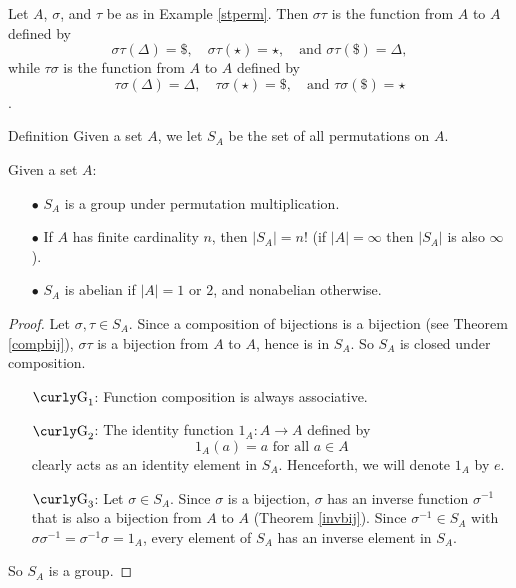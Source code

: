 \begin{example}{} Let $A$, $\sigma$, and $\tau$ be as in Example \ref{stperm}.
Then $\sigma \tau$ is the function from $A$ to $A$ defined by $$\sigma \tau(\Delta)=\$, \quad \sigma \tau(\star)=\star, \quad \mbox{and } \sigma \tau(\$)=\Delta,$$ while $\tau \sigma$ is
the function from $A$ to $A$ defined by $$\tau \sigma (\Delta)=\Delta, \quad \tau \sigma (\star)=\$, \quad \mbox{and } \tau \sigma(\$)=\star $$.
\end{example}

\begin{df}{Definition} Given a set $A$, we let $S_A$ be the set of all
permutations on $A$.\end{df}


\begin{thm}\label{sym}
Given a set $A$:
\begin{enumerate}
\item[$\bullet$] $S_A$ is a group under permutation multiplication.
\item[$\bullet$] If $A$ has finite cardinality $n$, then $|S_A|=n!$ (if $|A|=\infty$ then $|S_A|$ is also $\infty$).
\item[$\bullet$] $S_A$ is abelian if $|A|=1$ or $2$, and nonabelian otherwise.
\end{enumerate}
\end{thm}

\begin{proof} Let $\sigma, \tau \in S_A$. Since a composition of
bijections is a bijection (see Theorem \ref{compbij}), $\sigma
\tau$ is a bijection from $A$ to $A$, hence is in $S_A$. So
$S_A$ is closed under composition.
\begin{enumerate}
\item[$\G_1$:] Function composition is always associative.
\item[$\G_2$:] The identity function $1_A : A\to A$ defined by
    $$1_A(a)=a \mbox{ for all $a\in A$}$$ clearly acts as an
    identity element in $S_A$. Henceforth, we will denote $1_A$
    by $e$.
\item[$\G_3$:] Let $\sigma \in S_A$.  Since $\sigma$ is a
    bijection, $\sigma$ has an inverse function $\sigma^{-1}$
    that is also a bijection from $A$ to $A$ (Theorem
    \ref{invbij}). Since $\sigma^{-1}\in S_A$ with $\sigma
    \sigma^{-1}= \sigma^{-1} \sigma=1_A$, every element of
    $S_A$ has an inverse element in $S_A$.
\end{enumerate}
So $S_A$ is a group.\end{proof}

